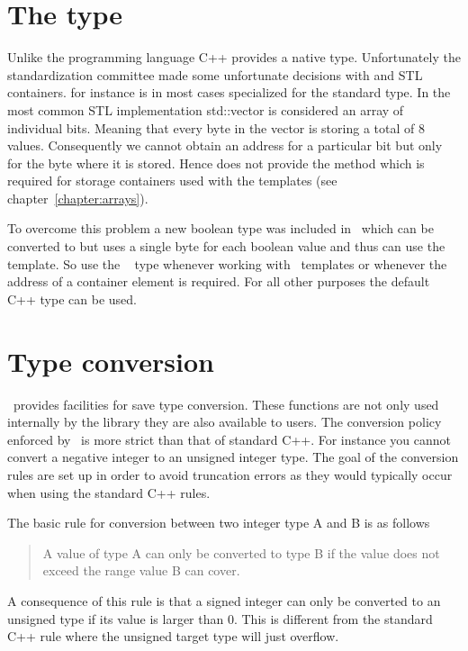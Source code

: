 \section{The  type}\label{section:using_bool}

Unlike the  programming language C++ provides a native  type. 
Unfortunately the  standardization committee made some unfortunate 
decisions with  and STL containers.  for instance is
in most cases specialized for the standard   type. 
In the most common STL implementation {\cpp std::vector} is considered an 
array of individual bits. Meaning that every byte in the vector is storing a
total of $8$  values. Consequently we cannot obtain an address 
for a particular bit but only for the byte where it is stored. 
Hence  does not provide the  method 
which is required for storage containers used with the  templates
(see chapter~\ref{chapter:arrays}). 

To overcome this problem a new boolean type was included in \libpnicore\ which 
can be converted to  but uses a single byte for each boolean value and
thus can use the  template. So use the \libpnicore\
 type whenever working with \libpnicore\ templates or whenever the
address of a container element is required. For all other purposes the default
C++ \cpp{bool} type can be used.

\section{Type conversion}

\libpnicore\ provides facilities for save type conversion. These functions are
not only used internally by the library they are also available to users. 
The conversion policy enforced by \libpnicore\ is more strict than that of
standard C++. For instance you cannot convert a negative integer to an unsigned
integer type. The goal of the conversion rules are set up in order to avoid
truncation errors as they would typically occur when using the standard C++
rules.

The basic rule for conversion between two integer type A and B is as follows
\begin{quote}
    A value of type A can only be converted to type B if the value does 
    not exceed the range value B can cover.
\end{quote}
A consequence of this rule is that a signed integer can only be converted 
to an unsigned type if its value is larger than $0$. This is different 
from the standard C++ rule where the unsigned target type will just overflow. 

